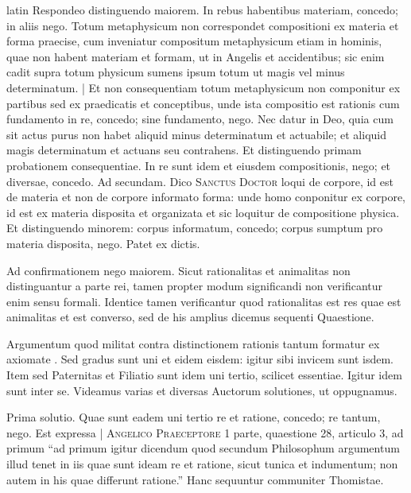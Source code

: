 \begin{otherlanguage*}{latin}
\pstart
 Respondeo distinguendo maiorem. In rebus habentibus materiam, concedo; in aliis nego. Totum metaphysicum non correspondet compositioni ex materia et forma praecise, cum inveniatur compositum metaphysicum etiam in hominis, quae non habent materiam et formam, ut in Angelis et accidentibus; sic enim cadit supra totum physicum sumens ipsum totum ut magis vel minus determinatum. \textnormal{|} Et non consequentiam totum metaphysicum non componitur ex partibus sed ex praedicatis et conceptibus, unde ista compositio est rationis cum fundamento in re, concedo; sine fundamento, nego. Nec datur in Deo, quia cum sit actus purus non habet aliquid minus determinatum et actuabile; et aliquid magis determinatum et actuans seu contrahens. Et distinguendo primam probationem consequentiae. In re sunt idem et eiusdem compositionis, nego; et diversae, concedo. Ad secundam. Dico \textsc{Sanctus Doctor} loqui de corpore, id est de materia et non de corpore informato forma: unde homo conponitur ex corpore, id est ex materia disposita et organizata et sic loquitur de compositione physica. Et distinguendo minorem: corpus informatum, concedo; corpus sumptum pro materia disposita, nego. Patet ex dictis. 
\pend

\pstart
 Ad confirmationem nego maiorem. Sicut rationalitas et animalitas non distinguantur a parte rei, tamen propter modum significandi non verificantur enim sensu formali. Identice tamen verificantur quod rationalitas est res quae est animalitas et est converso, sed de his amplius dicemus sequenti Quaestione. 
\pend

        \pstart
        \pend
      
\pstart
 Argumentum quod militat contra distinctionem rationis tantum formatur ex axiomate . Sed gradus sunt uni et eidem eisdem: igitur sibi invicem sunt isdem. Item sed Paternitas et Filiatio sunt idem uni tertio, scilicet essentiae. Igitur idem sunt inter se. Videamus varias et diversas Auctorum solutiones, ut oppugnamus. 
\pend

\pstart
 Prima solutio. Quae sunt eadem uni tertio re et ratione, concedo; re tantum, nego. Est expressa \textnormal{|}  \textsc{Angelico Praeceptore} 1 parte, quaestione 28, articulo 3, ad primum \enquote{ad primum igitur dicendum quod secundum Philosophum argumentum illud tenet in iis quae sunt ideam re et ratione, sicut tunica et indumentum; non autem in his quae differunt ratione.} Hanc sequuntur communiter Thomistae. 
\pend


\end{otherlanguage*}
